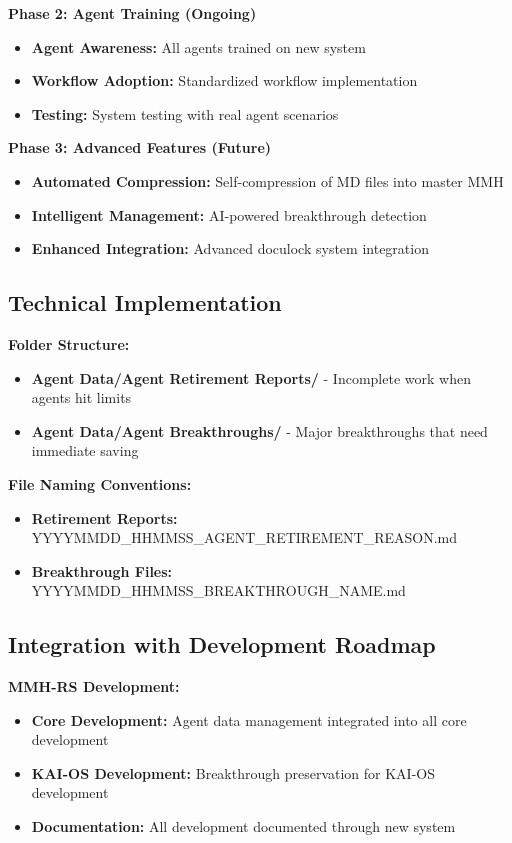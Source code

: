 \documentclass[12pt,a4paper]{article}
\begin{document}
\textbf{Phase 2: Agent Training (Ongoing)}
\begin{itemize}
    \item \textbf{Agent Awareness:} All agents trained on new system
    \item \textbf{Workflow Adoption:} Standardized workflow implementation
    \item \textbf{Testing:} System testing with real agent scenarios
\end{itemize}

\textbf{Phase 3: Advanced Features (Future)}
\begin{itemize}
    \item \textbf{Automated Compression:} Self-compression of MD files into master MMH
    \item \textbf{Intelligent Management:} AI-powered breakthrough detection
    \item \textbf{Enhanced Integration:} Advanced doculock system integration
\end{itemize}

\subsection{Technical Implementation}
\textbf{Folder Structure:}
\begin{itemize}
    \item \textbf{Agent Data/Agent Retirement Reports/} - Incomplete work when agents hit limits
    \item \textbf{Agent Data/Agent Breakthroughs/} - Major breakthroughs that need immediate saving
\end{itemize}

\textbf{File Naming Conventions:}
\begin{itemize}
    \item \textbf{Retirement Reports:} YYYYMMDD\_HHMMSS\_AGENT\_RETIREMENT\_REASON.md
    \item \textbf{Breakthrough Files:} YYYYMMDD\_HHMMSS\_BREAKTHROUGH\_NAME.md
\end{itemize}

\subsection{Integration with Development Roadmap}
\textbf{MMH-RS Development:}
\begin{itemize}
    \item \textbf{Core Development:} Agent data management integrated into all core development
    \item \textbf{KAI-OS Development:} Breakthrough preservation for KAI-OS development
    \item \textbf{Documentation:} All development documented through new system
\end{itemize}
\end{document}
